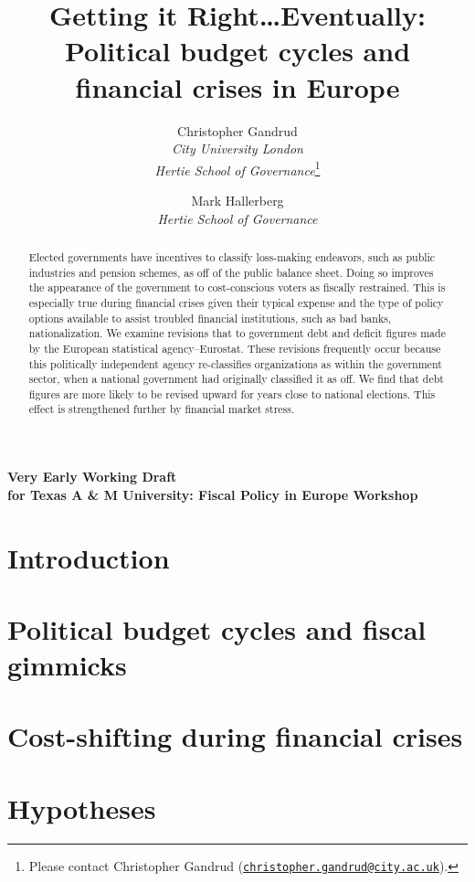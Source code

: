 \documentclass[]{article}
\title{Getting it Right\ldots Eventually: Political budget cycles and financial crises in Europe}
\author{Christopher Gandrud \\ \emph{City University London} \\ \emph{Hertie School of Governance}\footnote{Please contact Christopher Gandrud
(\href{mailto:christopher.gandrud@city.ac.uk}{\nolinkurl{christopher.gandrud@city.ac.uk}}).}
\and
Mark Hallerberg \\ \emph{Hertie School of Governance}}
\begin{document}
\maketitle

\begin{center}
    \textbf{Very Early Working Draft \\ for Texas A \& M University: Fiscal Policy in Europe Workshop}
\end{center}

\begin{abstract}
    Elected governments have incentives to classify loss-making endeavors, such as public industries and pension schemes, as off of the public balance sheet. Doing so improves the appearance of the government to cost-conscious voters as fiscally restrained. This is especially true during financial crises given their typical expense and the type of policy options available to assist troubled financial institutions, such as bad banks, nationalization. We examine revisions that to government debt and deficit figures made by the European statistical agency--Eurostat. These revisions frequently occur because this politically independent agency re-classifies organizations as within the government sector, when a national government had originally classified it as off.  We find that debt figures are more likely to be revised upward for years close to national elections. This effect is strengthened further by financial market stress.
\end{abstract}

\section{Introduction}

\section{Political budget cycles and fiscal gimmicks}

\cite{DeCastro2013} \cite{Alt2014}

\section{Cost-shifting during financial crises}

\cite{GandrudHallerberg2016}

\section{Hypotheses}
\end{document}
